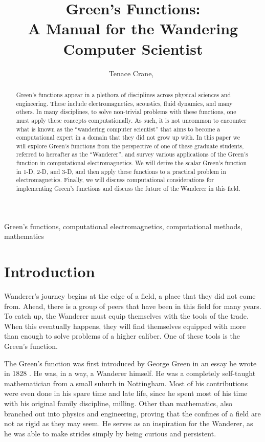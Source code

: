 \documentclass[lettersize,journal]{IEEEtran}
\begin{document}
\title{Green's Functions:\\ A Manual for the Wandering Computer Scientist}

\author{Tenace Crane,~
}

\maketitle

\begin{abstract}
Green's functions appear in a plethora of disciplines across physical sciences and engineering. These include electromagnetics, acoustics, fluid dynamics, and many others. In many disciplines, to solve non-trivial problems with these functions, one must apply these concepts computationally. As such, it is not uncommon to encounter what is known as the ``wandering computer scientist'' that aims to become a computational expert in a domain that they did not grow up with. In this paper we will explore Green's functions from the perspective of one of these graduate students, referred to hereafter as the ``Wanderer'', and survey various applications of the Green's function in computational electromagnetics. We will derive the scalar Green's function in 1-D, 2-D, and 3-D, and then apply these functions to a practical problem in electromagnetics. Finally, we will discuss computational considerations for implementing Green's functions and discuss the future of the Wanderer in this field.
\end{abstract}

\begin{IEEEkeywords}
Green's functions, computational electromagnetics, computational methods, mathematics
\end{IEEEkeywords}

\section{Introduction}
 Wanderer's journey begins at the edge of a field, a place that they did not come from. Ahead, there is a group of peers that have been in this field for many years. To catch up, the Wanderer must equip themselves with the tools of the trade. When this eventually happens, they will find themselves equipped with more than enough to solve problems of a higher caliber. One of these tools is the Green's function.

The Green's function was first introduced by George Green in an essay he wrote in 1828 \cite{green}. He was, in a way, a Wanderer himself. He was a completely self-taught mathematician from a small suburb in Nottingham. Most of his contributions were even done in his spare time and late life, since he spent most of his time with his original family discipline, milling. Other than mathematics, also branched out into physics and engineering, proving that the confines of a field are not as rigid as they may seem. He serves as an inspiration for the Wanderer, as he was able to make strides simply by being curious and persistent.
\end{document}
